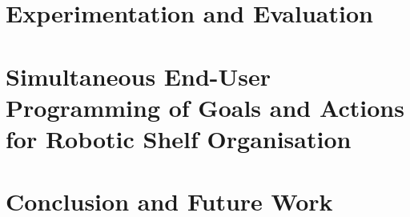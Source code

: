 \documentclass[a4paper,12pt,twoside,openany]{book}
\theoremstyle{definition}
\theoremstyle{remark}
\begin{document}
\chapter{Experimentation and Evaluation}\label{chap:Evaluation}


\chapter{Simultaneous End-User Programming of Goals and Actions for Robotic Shelf Organisation}\label{chap:OrganisingTasks}



\chapter{Conclusion and Future Work}\label{chap:Conclusion}



\clearpage



%
\end{document}
